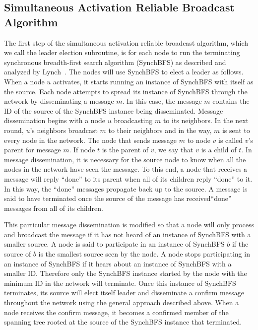 \documentclass[english]{article}
\begin{document}
  \subsection {Simultaneous Activation Reliable Broadcast Algorithm}

The first step of the simultaneous activation reliable broadcast algorithm, which we call the leader election subroutine, is for each node to run the terminating synchronous breadth-first search algorithm (SynchBFS) as described and analyzed by Lynch~\cite{Lynch:1996}. The nodes will use SynchBFS to elect a leader as follows. When a node $u$ activates, it starts running an instance of SynchBFS with itself as the source. Each node attempts to spread its instance of SynchBFS through the network by disseminating a message $m$. In this case, the message $m$ contains the ID of the source of the SynchBFS instance being disseminated. Message dissemination begins with a node $u$ broadcasting $m$ to its neighbors. In the next round, $u$'s neighbors broadcast $m$ to their neighbors and in the way, $m$ is sent to every node in the network. The node that sends message $m$ to node $v$ is called $v$'s parent for message $m$. If node $t$ is the parent of $v$, we say that $v$ is a child of $t$. In message dissemination, it is necessary for the source node to know when all the nodes in the network have seen the message. To this end, a node that receives a message will reply ``done'' to its parent when all of its children reply ``done'' to it. In this way, the ``done'' messages propagate back up to the source. A message is said to have terminated once the source of the message has received``done'' messages from all of its children.

This particular message dissemination is modified so that a node will only process and broadcast the message if it has not heard of an instance of SynchBFS with a smaller source. A node is said to participate in an instance of SynchBFS $b$ if the source of $b$ is the smallest source seen by the node. A node stops participating in an instance of SynchBFS if it hears about an instance of SynchBFS with a smaller ID. Therefore only the SynchBFS instance started by the node with the minimum ID in the network will terminate. Once this instance of SynchBFS terminates, its source will elect itself leader and disseminate a confirm message throughout the network using the general approach described above. When a node receives the confirm message, it becomes a confirmed member of the spanning tree rooted at the source of the SynchBFS instance that terminated. 
\end{document}
